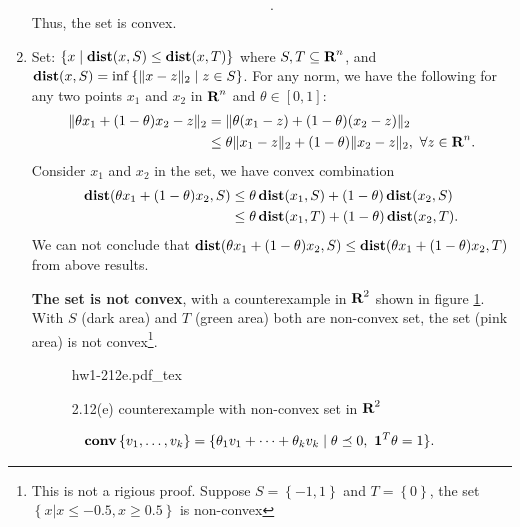 \documentclass[12pt]{article}
\begin{document}
\begin{solution}[2.12(a)-(e)]
\begin{enumerate}[label=(\alph*)]
\begin{align*}
			.\end{align*}
			Thus, the set is convex.
		\item Set: $\left\{ x \mid \mathop{\bf dist{}}(x,S)\le \mathop{\bf dist{}}(x,T) \right\} $ where $S,T\subseteq {\mbox{\bf R}}^n$, and  $\mathop{\bf dist{}}(x,S)=\inf \left\{ \|x-z\|_2  \mid z\in S\right\} $. 
			For any norm, we have the following for any two points $x_1$ and $x_2$ in ${\mbox{\bf R}}^n$ and $\theta\in\left[ 0,1 \right] $:
			\begin{align*}
				\|\theta x_1+(1-\theta)x_2-z\|_2 &= \|\theta(x_1-z)+(1-\theta)(x_2-z)\|_2\\
																				 &\le \theta \|x_1-z\|_2 + (1-\theta) \|x_2-z\|_2,\ \forall z\in {\mbox{\bf R}}^n
			.\end{align*}
			Consider $x_1$ and $x_2$ in the set, we have convex combination
			\begin{align*}
				\mathop{\bf dist{}}(\theta x_1+(1-\theta)x_2, S) &\le \theta \mathop{\bf dist{}}(x_1, S) + (1-\theta)\mathop{\bf dist{}}(x_2, S) \\
																					 &\le \theta \mathop{\bf dist{}}(x_1, T) + (1-\theta)\mathop{\bf dist{}}(x_2, T)
			.\end{align*}
			We can not conclude that $\mathop{\bf dist{}}(\theta x_1+(1-\theta)x_2, S) \le \mathop{\bf dist{}}(\theta x_1+(1-\theta)x_2, T)$ from above results.

			\textbf{The set is not convex}, with a counterexample in ${\mbox{\bf R}}^2$ shown in figure \ref{fig:-figures-hw1-212e-pdf}. With $S$ (dark area) and $T$ (green area) both are non-convex set, the set (pink area) is not convex\footnote{This is not a rigious proof. Suppose $S=\left\{ -1, 1 \right\}$ and $T=\left\{ 0 \right\} $, the set $\left\{ x| x\le -0.5, x\ge 0.5 \right\} $ is non-convex}.
			\begin{figure}[htpb]
				\centering
				\def\svgwidth{.6\columnwidth}
			{hw1-212e.pdf_tex}
				\caption{2.12(e) counterexample with non-convex set in ${\mbox{\bf R}}^2$}
				\label{fig:-figures-hw1-212e-pdf}
			\end{figure}
	\end{enumerate}
	
\end{solution}

\begin{solution}[2.15]
	
\end{solution}

\begin{solution}[2.4]

	\begin{align*}
		\conv\left\{ v_1,\ldots,v_k \right\} =\{\theta_{1}v_{1}+\cdots+\theta_{k}v_{k}\mid \theta \preceq 0,\ \ones^T\theta=1\}
	.\end{align*}
	
\end{solution}

\begin{solution}[A1.4]
	
\end{solution}

\begin{solution}[A2.7]
	
\end{solution}

\begin{solution}[2.13]
	
\end{solution}
\end{document}
